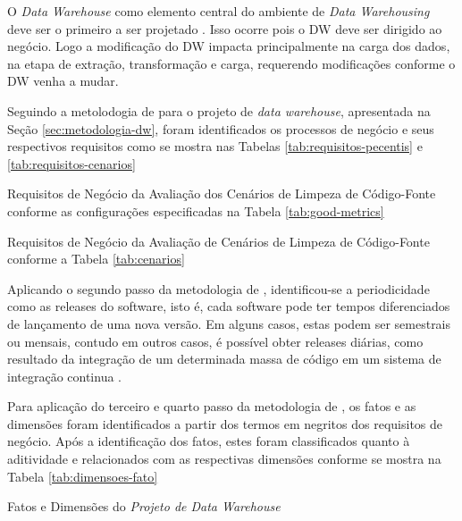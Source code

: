 O \textit{Data Warehouse} como elemento central do ambiente de \textit{Data Warehousing} deve ser o primeiro a ser projetado \cite{Kimball2002}. Isso ocorre pois o DW deve ser dirigido ao negócio. Logo a modificação do DW impacta principalmente na carga dos dados, na etapa de extração, transformação e carga, requerendo modificações conforme o DW venha a mudar.

Seguindo a metolodogia de  para o projeto de \textit{data warehouse}, apresentada na Seção \ref{sec:metodologia-dw}, foram identificados os processos de negócio e seus respectivos requisitos como se mostra nas Tabelas \ref{tab:requisitos-pecentis} e \ref{tab:requisitos-cenarios} 


\begin{table}[H]
\centering

\caption{Requisitos de Negócio da Avaliação dos Cenários de Limpeza de Código-Fonte conforme as configurações especificadas na Tabela \ref{tab:good-metrics}}
\label{tab:requisitos-pecentis}
\end{table}
\FloatBarrier


\begin{table}[H]
\centering

\caption{Requisitos de Negócio da Avaliação de Cenários de Limpeza de Código-Fonte conforme a Tabela \ref{tab:cenarios}}
\label{tab:requisitos-cenarios}
\end{table}
\FloatBarrier


Aplicando o segundo passo da metodologia de , identificou-se a periodicidade como as releases do software, isto é, cada software pode ter tempos diferenciados de lançamento de uma nova versão. Em alguns casos, estas podem ser semestrais ou mensais, contudo em outros casos, é possível obter releases diárias, como resultado da integração de um determinada massa de código em um sistema de integração continua \cite{beckarticle1999}. 

Para aplicação do terceiro e quarto passo da metodologia de , os fatos e as dimensões foram identificados a partir dos termos em negritos dos requisitos de negócio. Após a identificação dos fatos, estes foram classificados quanto à aditividade e relacionados com as respectivas dimensões conforme se mostra na Tabela \ref{tab:dimensoes-fato}


\begin{table}[H]
\centering

\caption{Fatos e Dimensões do \textit{Projeto de Data Warehouse}}
\label{tab:dimensoes-fato}
\end{table}
\FloatBarrier

